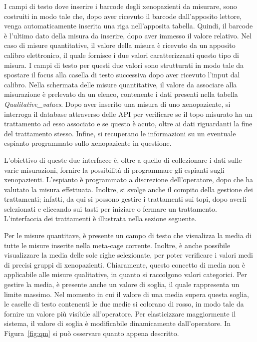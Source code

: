I campi di testo dove inserire i barcode degli xenopazienti da misurare, sono costruiti in modo tale che, dopo aver ricevuto il barcode dall'apposito lettore, venga automaticamente inserita una riga nell'apposita tabella. Quindi, il barcode \`e l'ultimo dato della misura da inserire, dopo aver immesso il valore relativo. Nel caso di misure quantitative, il valore della misura \`e ricevuto da un apposito calibro elettronico, il quale fornisce i due valori caratterizzanti questo tipo di misura. I campi di testo per questi due valori sono strutturati in modo tale da spostare il focus alla casella di testo successiva dopo aver ricevuto l'input dal calibro. Nella schermata delle misure quantitative, il valore da associare alla misurazione \`e prelevato da un elenco, contenente i dati presenti nella tabella \textit{Qualitative\_values}. Dopo aver inserito una misura di uno xenopaziente, si interroga il database attraverso delle API per verificare se il topo misurato ha un trattamento ad esso associato e se questo \`e acuto, oltre ai dati riguardanti la fine del trattamento stesso. Infine, si recuperano le informazioni su un eventuale espianto programmato sullo xenopaziente in questione.

L'obiettivo di queste due interfacce \`e, oltre a quello di collezionare i dati sulle varie misurazioni, fornire la possibilit\`a di programmare gli espianti sugli xenopazienti. L'espianto \`e programmato a discrezione dell'operatore, dopo che ha valutato la misura effettuata. Inoltre, si svolge anche il compito della gestione dei trattamenti; infatti, da qui si possono gestire i trattamenti sui topi, dopo averli selezionati e cliccando sui tasti per iniziare o fermare un trattamento. L'interfaccia dei trattamenti \`e illustrata nella sezione seguente.

Per le misure quantitave, \`e presente un campo di testo che visualizza la media di tutte le misure inserite nella meta-cage corrente. Inoltre, \`e anche possibile visualizzare la media delle sole righe selezionate, per poter verificare i valori medi di precisi gruppi di xenopazienti. Chiaramente, questo concetto di media non \`e applicabile alle misure qualitative, in quanto si raccolgono valori categorici. Per gestire la media, \`e presente anche un valore di soglia, il quale rappresenta un limite massimo. Nel momento in cui il valore di una media supera questa soglia, le caselle di testo contenenti le due medie si colorano di rosso, in modo tale da fornire un valore pi\`u visibile all'operatore. Per elasticizzare maggiormente il sistema, il valore di soglia \`e modificabile dinamicamente dall'operatore. In Figura~\ref{fig:qm} si pu\`o osservare quanto appena descritto.

